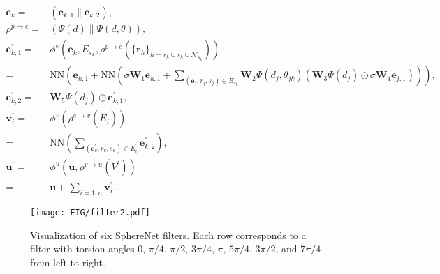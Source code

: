 \documentclass{article}
\begin{document}
\begin{equation}\label{eq:dimenet}
\begin{aligned}
\mathbf{e}_k
=&\left(\mathbf{e}_{k,1}\|\mathbf{e}_{k,2}\right),\\
\rho^{p\rightarrow e}
=&\left(\Psi\left(d\right)\|\Psi\left(d, \theta\right)\right),\\
\mathbf{e}^\prime_{k,1} 
=& \phi^e\left( \mathbf{e}_k, E_{s_k}, \rho^{p\rightarrow e}\left(\{\mathbf{r}_h\}_{h=r_k \cup s_k \cup \mathcal{N}_{s_k}}\right)\right)\\
=&\text{NN}\left(\mathbf{e}_{k,1}+\text{NN}\left(\sigma\mathbf{W}_1\mathbf{e}_{k,1}+\sum_{\left(\mathbf{e}_j, r_j, s_j\right)\in E_{s_k}}\mathbf{W}_2\Psi\left(d_j, \theta_{jk}\right)\left(\mathbf{W}_3 \Psi\left(d_j\right) \odot \sigma\mathbf{W}_4\mathbf{e}_{j,1}\right)\right)\right),\\
\mathbf{e}^\prime_{k,2} 
=&\mathbf{W}_5\Psi\left(d_j\right)\odot \mathbf{e}^\prime_{k,1},\\
\mathbf{v}^\prime_i 
=&\phi^v\left(\rho^{e\rightarrow v}\left(E_{i}^\prime\right)\right)\\
=&\text{NN}\left(\sum_{\left(\mathbf{e}^\prime_k, r_k, s_k\right)\in E_{i}^\prime}\mathbf{e}^\prime_{k,2}\right),\\
\mathbf{u}^\prime 
=&  \phi^u\left(\mathbf{u},\rho^{v\rightarrow u}\left(V^\prime\right)\right)\\
=& \mathbf{u} + \sum_{i=1:n}\mathbf{v}^\prime_i.
\end{aligned}
\end{equation}

\begin{figure}[b]
    \centering
    \texttt{[image: FIG/filter2.pdf]}
    \vspace{-6pt}
    \caption{Visualization of six SphereNet filters.
    Each row corresponds to a filter with torsion angles
    0, $\pi/4$, $\pi/2$, $3\pi/4$, $\pi$, $5\pi/4$, $3\pi/2$,
    and $7\pi/4$ from left to right.
    }\label{fig:filter2}
    \vspace{-10 pt}
\end{figure}
\end{document}
